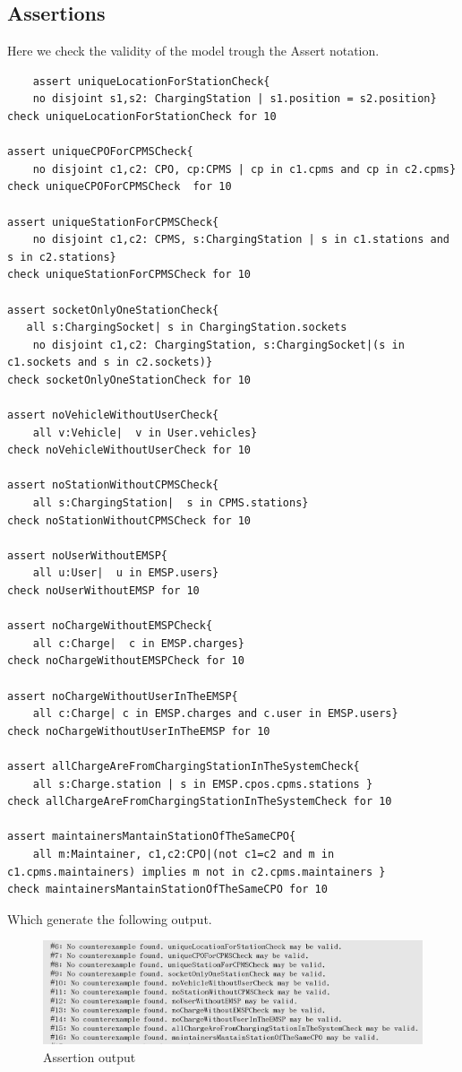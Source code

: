 \subsection{Assertions}
Here we check the validity of the model trough the Assert notation.
\begin{verbatim}
    assert uniqueLocationForStationCheck{
 	no disjoint s1,s2: ChargingStation | s1.position = s2.position}
check uniqueLocationForStationCheck for 10

assert uniqueCPOForCPMSCheck{
	no disjoint c1,c2: CPO, cp:CPMS | cp in c1.cpms and cp in c2.cpms}
check uniqueCPOForCPMSCheck  for 10

assert uniqueStationForCPMSCheck{
	no disjoint c1,c2: CPMS, s:ChargingStation | s in c1.stations and s in c2.stations}
check uniqueStationForCPMSCheck for 10

assert socketOnlyOneStationCheck{
   all s:ChargingSocket| s in ChargingStation.sockets
	no disjoint c1,c2: ChargingStation, s:ChargingSocket|(s in c1.sockets and s in c2.sockets)}
check socketOnlyOneStationCheck for 10

assert noVehicleWithoutUserCheck{
	all v:Vehicle|  v in User.vehicles}
check noVehicleWithoutUserCheck for 10

assert noStationWithoutCPMSCheck{
	all s:ChargingStation|  s in CPMS.stations}
check noStationWithoutCPMSCheck for 10

assert noUserWithoutEMSP{
	all u:User|  u in EMSP.users}
check noUserWithoutEMSP for 10

assert noChargeWithoutEMSPCheck{
	all c:Charge|  c in EMSP.charges}
check noChargeWithoutEMSPCheck for 10

assert noChargeWithoutUserInTheEMSP{
	all c:Charge| c in EMSP.charges and c.user in EMSP.users}
check noChargeWithoutUserInTheEMSP for 10

assert allChargeAreFromChargingStationInTheSystemCheck{
	all s:Charge.station | s in EMSP.cpos.cpms.stations }
check allChargeAreFromChargingStationInTheSystemCheck for 10

assert maintainersMantainStationOfTheSameCPO{
	all m:Maintainer, c1,c2:CPO|(not c1=c2 and m in c1.cpms.maintainers) implies m not in c2.cpms.maintainers }
check maintainersMantainStationOfTheSameCPO for 10
\end{verbatim}
Which generate the following output.
\begin{figure}[!h]
    \includegraphics[keepaspectratio, width=16cm]{Alloy/AssertionOutput.png}
    \caption{Assertion output}
\end{figure}
